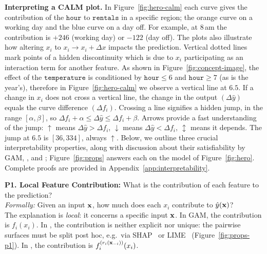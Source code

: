 \textbf{Interpreting a CALM plot.}
In Figure~\ref{fig:hero-calm} each curve gives the contribution of the $\mathtt{hour}$ to $\mathtt{rentals}$ in a specific region;
the orange curve on a working day and the blue curve on a day off.
For example, at 8\,am the contribution is $+246$ (working day) or $-122$ (day off).
The plots also illustrate how altering \( x_i \) to \(x_i \rightarrow x_i + \Delta x \) impacts the prediction.
Vertical dotted lines mark points of a hidden discontinuity which is due to $x_i$ participating as an interaction term for another feature. As shown in Figure~\ref{fig:concept-image}, the effect of the $\mathtt{temperature}$ is conditioned by $\mathtt{hour} \leq 6$ and $\mathtt{hour} \geq 7$ (as is the year's), therefore in Figure~\ref{fig:hero-calm} we observe a vertical line at $6.5$.
If a change in $x_i$ does not cross a vertical line, the change in the output \( (\Delta \hat{y}) \) equals the curve difference \( (\Delta f_i )\).
Crossing a line signifies a hidden jump, in the range $[\alpha, \beta]$, so 
$ \Delta f_i + \alpha \leq \Delta \hat{y} \leq \Delta f_i + \beta$.
Arrows provide a fast understanding of the jump:
\(\uparrow\) means $\Delta \hat{y} > \Delta f_i$,
\(\downarrow\) means $\Delta \hat{y} < \Delta f_i$,
\(\updownarrow\) means it depends.
The jump at $6.5$ is $[36, 334]$, always \(\uparrow\).
Below, we outline three crucial interpretability properties, along with discussion about their satisfiability by GAM, \gamm, and \method; Figure~\ref{fig:props} answers each on the model of Figure~\ref{fig:hero}. Complete proofs are provided in Appendix~\ref{app:interpretability}.



\textbf{P1. Local Feature Contribution:} What is the contribution of each feature to the prediction?\\
\textit{Formally:} Given an input $\mathbf{x}$, how much does each $x_i$ contribute to $\hat y(\mathbf{x})$?\\
The explanation is \emph{local}: it concerns a specific input $\mathbf{x}$.
In GAM, the contribution is \( f_i(x_i) \).
In \gamm, the contribution is neither explicit nor unique: the pairwise surfaces must be split post hoc, e.g.\ via SHAP~\cite{lundberg2017unified} or LIME~\cite{ribeiro2016should} (Figure~\ref{fig:props-p1}).
In \method, the contribution is \( f_i^{(r_i(\mathbf{x}_{-i}))}(x_i) \).

